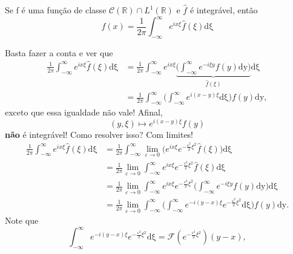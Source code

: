 \documentclass[../pde_notes.tex]{subfiles}
\begin{document}
\begin{theorem*}
	Se f é uma função de classe \(\mathcal{C}(\mathbb{R})\cap L^{1}(\mathbb{R})\) e \(\hat{f}\) é integrável, então
	\[
		f(x) = \frac{1}{2\pi }\int_{-\infty}^{\infty}e^{ix\xi }\hat{f}(\xi ) \mathrm{d\xi }
	\]
\end{theorem*}
\begin{proof*}
	Basta fazer a conta e ver que
	\begin{align*}
		\frac{1}{2\pi }\int_{-\infty}^{\infty}e^{ix\xi }\hat{f}(\xi ) \mathrm{d\xi } & = \frac{1}{2\pi }\int_{-\infty}^{\infty}e^{ix\xi }\underbrace{\biggl(\int_{-\infty}^{\infty}e^{-i\xi y}f(y) \mathrm{dy}\biggr)}_{\hat{f}(\xi )} \mathrm{d\xi } \\
		                                                                             & =\frac{1}{2\pi }\int_{-\infty}^{\infty}\biggl(\int_{-\infty}^{\infty}e^{i(x-y)\xi } \mathrm{d\xi }\biggr)f(y)\mathrm{dy},
	\end{align*}
	exceto que essa igualdade não vale! Afinal,
	\[
		(y, \xi )\mapsto e^{i(x-y)\xi }f(y)
	\]
	\textbf{não} é integrável! Como resolver isso? Com limites!
	\begin{align*}
		\frac{1}{2\pi }\int_{-\infty}^{\infty}e^{ix\xi }\hat{f}(\xi ) \mathrm{d\xi } & = \frac{1}{2\pi }\int_{-\infty}^{\infty}\lim_{\varepsilon \to 0}\biggl(e^{ix\xi }e^{-\frac{\varepsilon^{2}}{2}\xi^{2}}\hat{f}(\xi )\biggr) \mathrm{d\xi }                                      \\
		                                                                             & = \frac{1}{2\pi }\lim_{\varepsilon \to 0}\int_{-\infty}^{\infty}e^{ix\xi }e^{-\frac{\varepsilon^{2} }{2}\xi^{2}}\hat{f}(\xi ) \mathrm{d\xi }                                                   \\
		                                                                             & = \frac{1}{2\pi }\lim_{\varepsilon \to 0}\int_{-\infty}^{\infty}e^{ix\xi }e^{-\frac{\varepsilon^{2}}{2}\xi^{2}}\biggl(\int_{-\infty}^{\infty}e^{-i\xi y}f(y) \mathrm{dy}\biggr) \mathrm{d\xi } \\
		                                                                             & = \frac{1}{2\pi }\lim_{\varepsilon \to 0}\int_{-\infty}^{\infty}\biggl(\int_{-\infty}^{\infty}e^{-i(y-x)\xi }e^{-\frac{\varepsilon^{2} }{2}\xi^{2}} \mathrm{d\xi }\biggr)f(y) \mathrm{dy}.
	\end{align*}
	Note que
	\[
		\int_{-\infty}^{\infty}e^{-i(y-x)\xi }e^{-\frac{\varepsilon^{2}}{2}\xi^{2}} \mathrm{d\xi } = \mathcal{F}(e^{-\frac{\varepsilon^{2}}{2}\xi^{2}})(y-x),
\]
\end{proof*}
\end{document}
